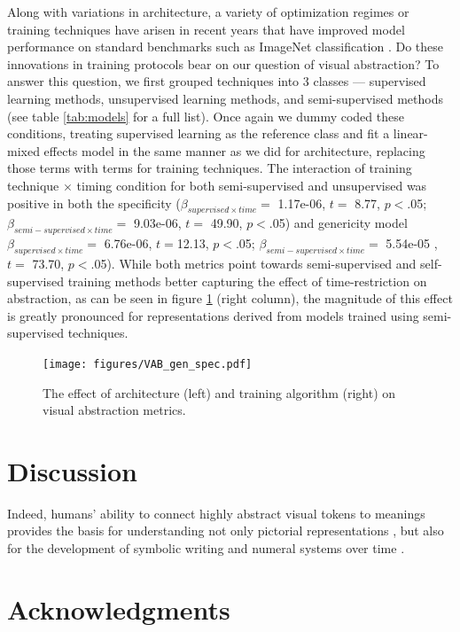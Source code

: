 \documentclass[10pt,letterpaper]{article}
\begin{document}
Along with variations in architecture, a variety of optimization regimes or training techniques have arisen in recent years that have improved model performance on standard benchmarks such as ImageNet classification \cite{deng2009imagenet}. Do these innovations in training protocols bear on our question of visual abstraction? 
To answer this question, we first grouped techniques into 3 classes — supervised learning methods, unsupervised learning methods, and semi-supervised methods (see table \ref{tab:models} for a full list). Once again we dummy coded these conditions, treating supervised learning as the reference class and fit a linear-mixed effects model in the same manner as we did for architecture, replacing those terms with terms for training techniques. The interaction of training technique $\times$ timing condition for both semi-supervised and unsupervised was positive in both the specificity ($\beta_{supervised \times time}= $ 1.17e-06, $t =$ 8.77, $p<$.05; $\beta_{semi-supervised \times time}= $ 9.03e-06, $t =$ 49.90, $p<$.05) and genericity model $\beta_{supervised \times time}= $ 6.76e-06, $t =$12.13, $p<$.05; $\beta_{semi-supervised \times time}= $ 5.54e-05 , $t =$ 73.70, $p<$.05).
While both metrics point towards semi-supervised and self-supervised training methods better capturing the effect of time-restriction on abstraction, as can be seen in figure \ref{fig:gen_spec} (right column), the magnitude of this effect is greatly pronounced for representations derived from models trained using semi-supervised techniques.



\begin{figure}
    \centering
    \texttt{[image: figures/VAB\_gen\_spec.pdf]}
    \caption{The effect of architecture (left) and training algorithm (right) on visual abstraction metrics. }
    \label{fig:gen_spec}
\end{figure}


\section{Discussion}

Indeed, humans' ability to connect highly abstract visual tokens to meanings provides the basis for understanding not only pictorial representations \cite{hawkins2021visual, garrod2007foundations}, but also for the development of symbolic writing and numeral systems over time \cite{schmandt2010writing, chrisomalis2020reckonings}.

\section{Acknowledgments}





\setlength{\bibleftmargin}{.125in}
\setlength{\bibindent}{-\bibleftmargin}


\end{document}

